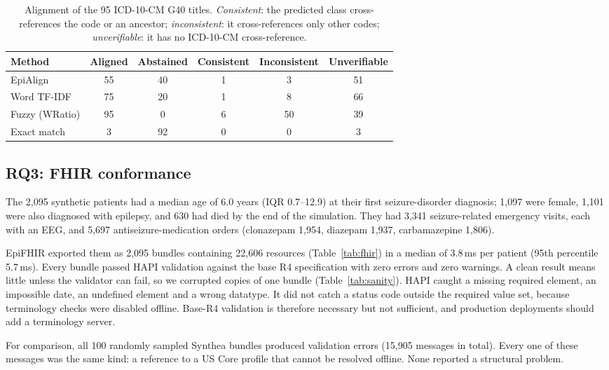 \documentclass[preprint,12pt]{elsarticle}
\begin{document}
\begin{table}[t]
\centering
\caption{Alignment of the 95 ICD-10-CM G40 titles. \textit{Consistent}: the predicted class cross-references the code or an ancestor; \textit{inconsistent}: it cross-references only other codes; \textit{unverifiable}: it has no ICD-10-CM cross-reference.}
\label{tab:icd}
\footnotesize
\begin{tabular}{@{}lccccc@{}}
\toprule
Method & Aligned & Abstained & Consistent & Inconsistent & Unverifiable \\
\midrule
EpiAlign & 55 & 40 & 1 & 3 & 51 \\
Word TF-IDF & 75 & 20 & 1 & 8 & 66 \\
Fuzzy (WRatio) & 95 & 0 & 6 & 50 & 39 \\
Exact match & 3 & 92 & 0 & 0 & 3 \\
\bottomrule
\end{tabular}
\end{table}

\subsection{RQ3: FHIR conformance}
The 2,095 synthetic patients had a median age of 6.0 years (IQR 0.7--12.9) at their first seizure-disorder diagnosis; 1,097 were female, 1,101 were also diagnosed with epilepsy, and 630 had died by the end of the simulation. They had 3,341 seizure-related emergency visits, each with an EEG, and 5,697 antiseizure-medication orders (clonazepam 1,954, diazepam 1,937, carbamazepine 1,806).

EpiFHIR exported them as 2,095 bundles containing 22,606 resources (Table~\ref{tab:fhir}) in a median of 3.8\,ms per patient (95th percentile 5.7\,ms). Every bundle passed HAPI validation against the base R4 specification with zero errors and zero warnings. A clean result means little unless the validator can fail, so we corrupted copies of one bundle (Table~\ref{tab:sanity}). HAPI caught a missing required element, an impossible date, an undefined element and a wrong datatype. It did not catch a status code outside the required value set, because terminology checks were disabled offline. Base-R4 validation is therefore necessary but not sufficient, and production deployments should add a terminology server.

For comparison, all 100 randomly sampled Synthea bundles produced validation errors (15,905 messages in total). Every one of these messages was the same kind: a reference to a US Core profile that cannot be resolved offline. None reported a structural problem.
\end{document}
